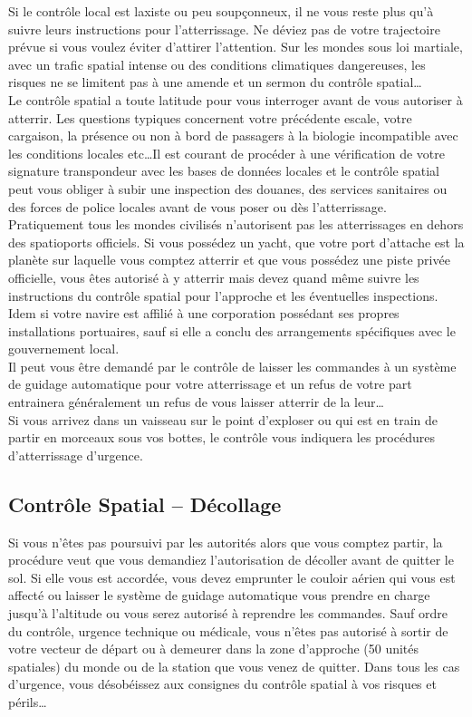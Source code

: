\documentclass{article}
\begin{document}
Si le contrôle local est laxiste ou peu soupçonneux, il ne vous reste plus qu'à suivre leurs instructions pour l'atterrissage. Ne déviez pas de votre trajectoire prévue si vous voulez éviter d'attirer l'attention. Sur les mondes sous loi martiale, avec un trafic spatial intense ou des conditions climatiques dangereuses, les risques ne se limitent pas à une amende et un sermon du contrôle spatial\ldots \\

Le contrôle spatial a toute latitude pour vous interroger avant de vous autoriser à atterrir. Les questions typiques concernent votre précédente escale, votre cargaison, la présence ou non à bord de passagers à la biologie incompatible avec les conditions locales etc\ldots Il est courant de procéder à une vérification de votre signature transpondeur avec les bases de données locales et le contrôle spatial peut vous obliger à subir une inspection des douanes, des services sanitaires ou des forces de police locales avant de vous poser ou dès l'atterrissage.\\

Pratiquement tous les mondes civilisés n'autorisent pas les atterrissages en dehors des spatioports officiels. Si vous possédez un yacht, que votre port d'attache est la planète sur laquelle vous comptez atterrir et que vous possédez une piste privée officielle, vous êtes autorisé à y atterrir mais devez quand même suivre les instructions du contrôle spatial pour l'approche et les éventuelles inspections. Idem si votre navire est affilié à une corporation possédant ses propres installations portuaires, sauf si elle a conclu des arrangements spécifiques avec le gouvernement local.\\

Il peut vous être demandé par le contrôle de laisser les commandes à un système de guidage automatique pour votre atterrissage et un refus de votre part entrainera généralement un refus de vous laisser atterrir de la leur\ldots \\

Si vous arrivez dans un vaisseau sur le point d'exploser ou qui est en train de partir en morceaux sous vos bottes, le contrôle vous indiquera les procédures d'atterrissage d'urgence.

\subsection*{Contrôle Spatial -- Décollage}
Si vous n'êtes pas poursuivi par les autorités alors que vous comptez partir, la procédure veut que vous demandiez l'autorisation de décoller avant de quitter le sol. Si elle vous est accordée, vous devez emprunter le couloir aérien qui vous est affecté ou laisser le système de guidage automatique vous prendre en charge jusqu'à l'altitude ou vous serez autorisé à reprendre les commandes. Sauf ordre du contrôle, urgence technique ou médicale, vous n'êtes pas autorisé à sortir de votre vecteur de départ ou à demeurer dans la zone d'approche (50 unités spatiales) du monde ou de la station que vous venez de quitter. Dans tous les cas d'urgence, vous désobéissez aux consignes du contrôle spatial à vos risques et périls\ldots
\end{document}
